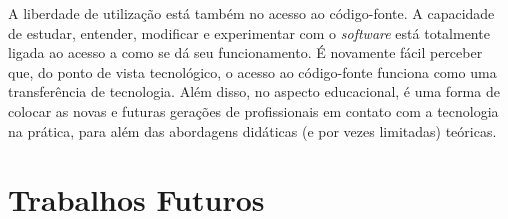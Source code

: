 A liberdade de utilização está também no acesso ao código-fonte. A capacidade de estudar, entender, modificar e experimentar
com o \textit{software} está totalmente ligada ao acesso a como se dá seu funcionamento. É novamente fácil perceber que,
do ponto de vista tecnológico, o acesso ao código-fonte funciona como uma transferência de tecnologia. Além disso, no
aspecto educacional, é uma forma de colocar as novas e futuras gerações de profissionais em contato com a tecnologia na
prática, para além das abordagens didáticas (e por vezes limitadas) teóricas. 



\section{Trabalhos Futuros}
